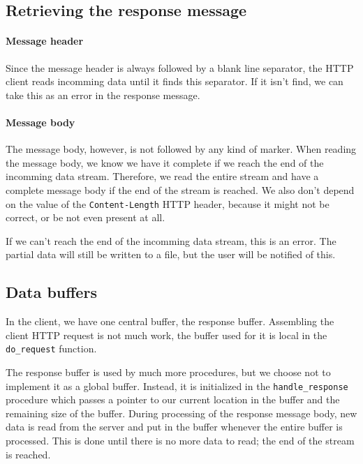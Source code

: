 \documentclass[11pt]{article}
\begin{document}
\subsection{Retrieving the response message}

\paragraph{Message header}

Since the message header is always followed by a blank line separator, the
HTTP client reads incomming data until it finds this separator. If it isn't
find, we can take this as an error in the response message.

\paragraph{Message body}

The message body, however, is not followed by any kind of marker. When reading
the message body, we know we have it complete if we reach the end of the
incomming data stream. Therefore, we read the entire stream and have a
complete message body if the end of the stream is reached. We also don't
depend on the value of the \lstinline|Content-Length| HTTP header, because it
might not be correct, or be not even present at all.

If we can't reach the end of the incomming data stream, this is an error. The
partial data will still be written to a file, but the user will be notified of
this.


\subsection{Data buffers}\label{sec:clientbuffers}

In the client, we have one central buffer, the response buffer. Assembling the
client HTTP request is not much work, the buffer used for it is local in the
\lstinline|do_request| function.

The response buffer is used by much more procedures, but we choose not to
implement it as a global buffer. Instead, it is initialized in the
\lstinline|handle_response| procedure which passes a pointer to our current
location in the buffer and the remaining size of the buffer. During processing
of the response message body, new data is read from the server and put in the
buffer whenever the entire buffer is processed. This is done until there is no
more data to read; the end of the stream is reached.
\end{document}
